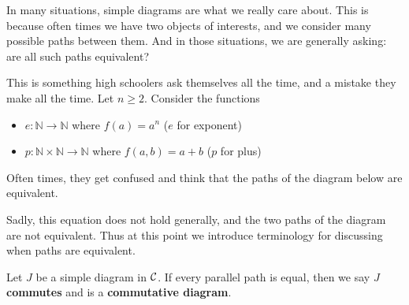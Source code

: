     In many situations, simple diagrams are what we really care about. This is because 
    often times we have two objects of interests, and we consider many possible paths between 
    them.
    And in those situations, we are generally asking: are all such paths equivalent? 

    This is something high schoolers ask themselves all the time, and a mistake 
    they make all the time. Let $n \ge 2$. Consider the functions
    \begin{itemize}
        \item $e: \mathbb{N} \to \mathbb{N}$ where $f(a) = a^n$ ($e$ for exponent)
        \item $p: \mathbb{N}\times \mathbb{N} \to \mathbb{N}$ where  $f(a,b) = a + b$ ($p$ for plus)
    \end{itemize}
    Often times, they get confused and think that the paths of the diagram below are equivalent.
    \begin{center}
        \hspace{1cm}
    \end{center}
    Sadly, this equation does not hold generally, and the two paths of the diagram 
    are not equivalent. Thus at this point we introduce terminology for 
    discussing when paths are equivalent.

    \begin{definition}
        Let $J$ be a simple diagram in $\mathcal{C}$. If every parallel path is equal, then we say
        $J$ \textbf{commutes} and is a \textbf{commutative diagram}. 
    \end{definition}

